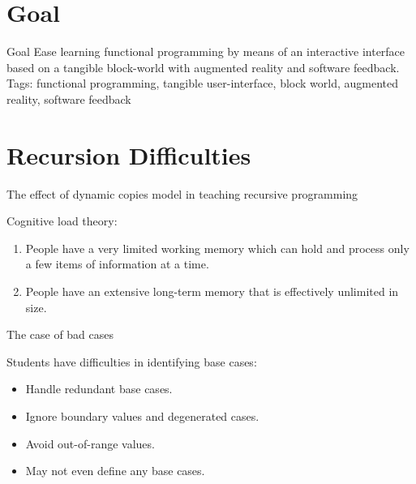\section{Goal}

\begin{frame}{Goal}
  Ease learning functional programming by means of an interactive
  interface based on a tangible block-world with augmented reality
  and software feedback.
  \vfill
  \textsf{Tags}: functional programming, tangible user-interface,
  block world, augmented reality, software feedback
\end{frame}


\section{Recursion Difficulties}

\begin {frame} {The effect of dynamic copies model in teaching recursive programming}
  
  Cognitive load theory:
  
  \begin{enumerate}
  \item People have a very limited working memory which can hold and process
    only a few items of information at a time.
  \item People have an extensive long-term memory that is effectively
    unlimited in size.
  \end{enumerate}
\end{frame}

\begin{frame}{The case of bad cases}
  
  Students have difficulties in identifying base cases:
  
  \begin{itemize}
  \item Handle redundant base cases.
  \item Ignore boundary values and degenerated cases.
  \item Avoid out-of-range values.
  \item May not even define any base cases.
  \end{itemize}
\end{frame}

